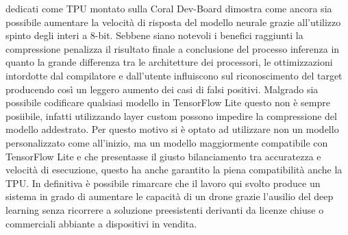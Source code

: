 dedicati come TPU montato sulla Coral Dev-Board dimostra come ancora sia
possibile aumentare la velocità di risposta del modello neurale grazie
all'utilizzo spinto degli interi a 8-bit. Sebbene siano notevoli i benefici
raggiunti la compressione penalizza il risultato finale a conclusione del
processo inferenza in quanto la grande differenza tra le architetture dei
processori, le ottimizzazioni intordotte dal compilatore e dall'utente
influiscono sul riconoscimento del target producendo così un leggero aumento dei
casi di falsi positivi.
Malgrado sia possibile codificare qualsiasi modello in TensorFlow Lite questo
non è sempre posiibile, infatti utilizzando layer custom possono impedire la
compressione del modello addestrato.
Per questo motivo si è optato ad utilizzare non un modello personalizzato come
all'inizio, ma un modello maggiormente compatibile con TensorFlow Lite e che
presentasse il giusto bilanciamento tra accuratezza e velocità di esecuzione,
questo ha anche garantito la piena compatibilità anche la TPU.
In definitiva è possibile rimarcare che il lavoro qui svolto produce un sistema
in grado di aumentare le capacità di un drone grazie l'ausilio del deep learning
senza ricorrere a soluzione preesistenti derivanti da licenze chiuse o
commerciali abbiante a dispositivi in vendita.